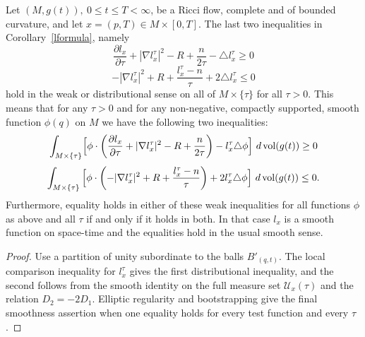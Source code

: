 \begin{theorem}
\label{thm:l-weak-inequalities}
\label{weak}
Let $(M,g(t)),\ 0\le t\le T<\infty$, be a Ricci flow, complete and
of bounded curvature, and let $x=(p,T)\in M\times[0,T]$. The last
two inequalities in Corollary~\ref{lformula}, namely
$$\frac{\partial l_x}{\partial \tau}+|\nabla l^\tau_x|^2-R+\frac{n}{2\tau}
- \triangle l^\tau_x\ge 0$$
$$-|\nabla l^\tau_x|^2+R+\frac{l^\tau_x-n}{\tau}+2\triangle l^\tau_x\le 0$$
hold in the weak or distributional sense on all of $M\times\{\tau\}$
for all $\tau>0$. This means that for any $\tau>0$ and for any
non-negative, compactly supported, smooth function $\phi(q)$ on $M$
we have the following two inequalities:
$$\int_{M\times \{\tau\}}\Bigl[ \phi\cdot\left(\frac{\partial l_x}{\partial \tau}+|\nabla
l_x^\tau|^2-R+\frac{n}{2\tau}\right) - l_x^\tau\triangle \phi\Bigr]\
d\operatorname{vol}(g(t))\ge 0$$
$$\int_{M\times \{\tau\}}\Big[ \phi\cdot\left(-|\nabla
l_x^\tau|^2+R+\frac{l_x^\tau-n}{\tau}\right)+2l^\tau_x\triangle
\phi\Bigr]\ d\operatorname{vol}(g(t))\le 0.$$ Furthermore, equality holds in
either of these weak inequalities for all functions $\phi$ as above
and all $\tau$ if and only if it holds in both. In that case $l_x$
is a smooth function on space-time and the equalities hold in the
usual smooth sense.
\end{theorem}
\begin{proof}\sketch
{}
Use a partition of unity subordinate to the balls $B'_{(q,t)}$. The local
comparison inequality for $l_x^\tau$ gives the first distributional
inequality, and the second follows from the smooth identity on the full
measure set ${\mathcal U}_x(\tau)$ and the relation $D_2=-2D_1$. Elliptic
regularity and bootstrapping give the final smoothness assertion when
one equality holds for every test function and every $\tau$.
\end{proof}








